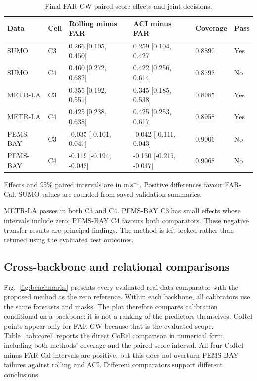 \documentclass[pdflatex,sn-mathphys-num]{sn-jnl}
\newcommand{\ms}{\mathrm{m\,s^{-1}}}
\begin{document}
\begin{table}[!htbp]
\caption{Final FAR-GW paired score effects and joint decisions.}\label{tab:primary}
\centering\setlength{\tabcolsep}{3pt}\small
\begin{tabular}{llllll}\toprule
Data & Cell & Rolling minus FAR & ACI minus FAR & Coverage & Pass \\\midrule
SUMO & C3 & 0.266 [0.105, 0.450] & 0.259 [0.104, 0.427] & 0.8890 & Yes \\
SUMO & C4 & 0.460 [0.272, 0.682] & 0.422 [0.256, 0.614] & 0.8793 & No \\
METR-LA & C3 & 0.355 [0.192, 0.551] & 0.345 [0.185, 0.538] & 0.8985 & Yes \\
METR-LA & C4 & 0.425 [0.238, 0.638] & 0.425 [0.253, 0.617] & 0.8958 & Yes \\
PEMS-BAY & C3 & -0.035 [-0.101, 0.047] & -0.042 [-0.111, 0.043] & 0.9006 & No \\
PEMS-BAY & C4 & -0.119 [-0.194, -0.043] & -0.130 [-0.216, -0.047] & 0.9068 & No \\
\bottomrule\end{tabular}
\par\smallskip\footnotesize Effects and 95\% paired intervals are in $\ms$. Positive differences favour FAR-Cal. SUMO values are rounded from saved validation summaries.
\end{table}
\FloatBarrier

METR-LA passes in both C3 and C4. PEMS-BAY C3 has small effects whose intervals include zero; PEMS-BAY C4 favours both comparators. These negative transfer results are principal findings. The method is left locked rather than retuned using the evaluated test outcomes.

\subsection{Cross-backbone and relational comparisons}
Fig.~\ref{fig:benchmarks} presents every evaluated real-data comparator with the proposed method as the zero reference. Within each backbone, all calibrators use the same forecasts and masks. The plot therefore compares calibration conditional on a backbone; it is not a ranking of the predictors themselves. CoRel points appear only for FAR-GW because that is the evaluated scope. Table~\ref{tab:corel} reports the direct CoRel comparison in numerical form, including both methods' coverage and the paired score interval. All four CoRel-minus-FAR-Cal intervals are positive, but this does not overturn PEMS-BAY failures against rolling and ACI. Different comparators support different conclusions.
\end{document}
